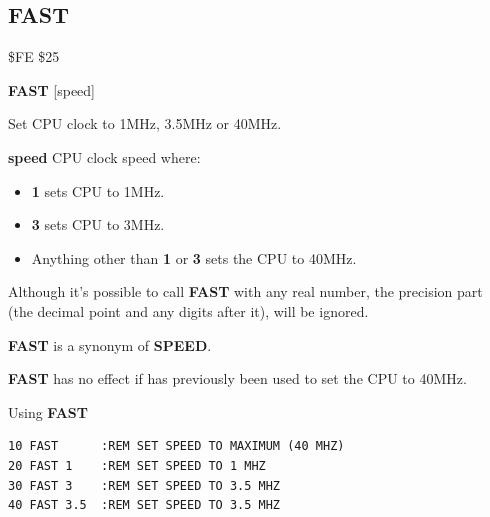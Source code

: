 
\newpage
\subsection{FAST}
\begin{description}[leftmargin=2cm,style=nextline]
\item [Token:] \$FE \$25
\item [Format:] {\bf FAST} [speed]
\item [Usage:] Set CPU clock to 1MHz, 3.5MHz or 40MHz.

                {\bf speed} CPU clock speed where:
                \begin{itemize}
                    \item {\bf 1} sets CPU to 1MHz.
                    \item {\bf 3} sets CPU to 3MHz.
                    \item Anything other than {\bf 1} or {\bf 3} sets the CPU to 40MHz.
                \end{itemize}
\item [Remarks:] Although it's possible to call {\bf FAST}
                 with any real number, the precision part (the decimal point
                 and any digits after it), will be ignored.

                 {\bf FAST} is a synonym of {\bf SPEED}.

                 {\bf FAST} has no effect if 
                 has previously been used to set the CPU to 40MHz.

\item [Example:] Using {\bf FAST}
\begin{tcolorbox}[colback=black,coltext=white]
\verbatimfont{\codefont}
\begin{verbatim}
10 FAST      :REM SET SPEED TO MAXIMUM (40 MHZ)
20 FAST 1    :REM SET SPEED TO 1 MHZ
30 FAST 3    :REM SET SPEED TO 3.5 MHZ
40 FAST 3.5  :REM SET SPEED TO 3.5 MHZ
\end{verbatim}
\end{tcolorbox}
\end{description}


\newpage
